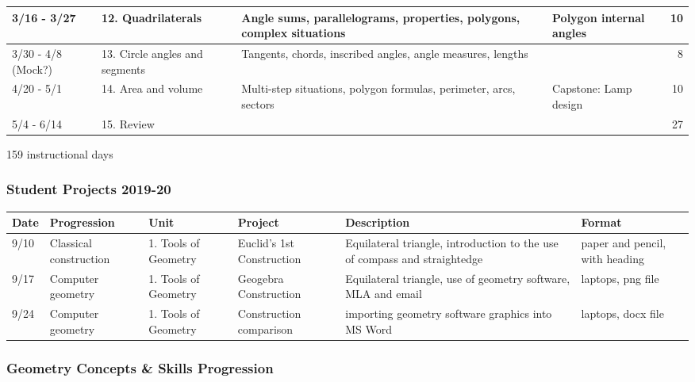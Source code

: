 \documentclass[12pt, twoside]{article}
\begin{document}
\begin{tabular}{|p{2.4cm}|p{4.7cm}|p{9cm}|p{4cm}|r|}
  \hline
  3/16 - 3/27 & 12. Quadrilaterals & Angle sums, parallelograms, properties, polygons, complex situations & Polygon internal angles & 10 \\
  \hline
  3/30 - 4/8 (Mock?) & 13. Circle angles and segments & Tangents, chords, inscribed angles, angle measures, lengths &  & 8 \\
  \hline
  4/20 - 5/1 & 14. Area and volume & Multi-step situations,  polygon formulas, perimeter, arcs, sectors &Capstone: Lamp design & 10 \\
  \hline
  5/4 - 6/14 & 15. Review &  & & 27 \\
  \hline
\end{tabular}

159 instructional days

\newpage
\subsubsection*{Student Projects 2019-20}

\begin{tabular}{|p{1cm}|p{2.5cm}|p{3cm}|p{4cm}|p{8cm}|p{4cm}|}
  \hline
  Date & Progression & Unit & Project & Description & Format \\
  \hline
  9/10 & Classical construction & 1. Tools of Geometry & Euclid's 1st Construction & Equilateral triangle, introduction to the use of compass and straightedge & paper and pencil, with heading \\
  \hline
  9/17 & Computer geometry & 1. Tools of Geometry & Geogebra Construction & Equilateral triangle, use of geometry software, MLA and email & laptops, png file \\
  \hline
  9/24 & Computer geometry & 1. Tools of Geometry & Construction comparison & importing geometry software graphics into MS Word & laptops, docx file \\
  \hline
\end{tabular}

\newpage
\subsubsection*{Geometry Concepts \& Skills Progression}
\end{document}
